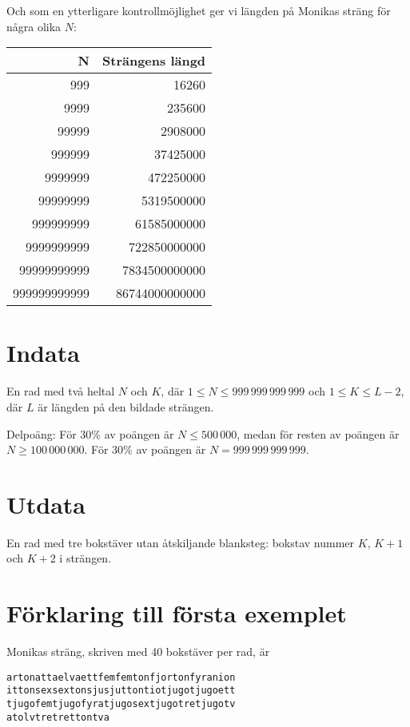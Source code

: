 Och som en ytterligare kontrollmöjlighet ger vi längden på Monikas sträng för några olika $N$:

\begin{tabular}{|r|r|}\hline
{\bf N} & {\bf Strängens längd} \\ \hline
999 & 16260 \\
9999 & 235600 \\
99999 & 2908000 \\
999999 & 37425000 \\
9999999   & 472250000 \\
99999999 & 5319500000\\
999999999 & 61585000000\\
9999999999 & 722850000000 \\
99999999999 &	7834500000000 \\
999999999999 &86744000000000 \\ \hline
\end{tabular}


\section*{Indata}
En rad med två heltal $N$ och $K$, där $1\leq N\leq 999\,999\,999\,999$ och $1\leq K \leq L-2$, där $L$ är längden på den bildade strängen.

Delpoäng: För 30\% av poängen är $ N\leq 500\,000$, medan för resten av poängen är $ N\geq 100\,000\,000$. För 30\% av poängen är $ N=999\,999\,999\,999$.

\section*{Utdata}
En rad med tre bokstäver utan åtskiljande blanksteg: bokstav nummer $K$, $K+1$ och $K+2$ i strängen. 

\section*{Förklaring till första exemplet}

Monikas sträng, skriven med 40 bokstäver per rad, är

\begin{verbatim}
artonattaelvaettfemfemtonfjortonfyranion
ittonsexsextonsjusjuttontiotjugotjugoett
tjugofemtjugofyratjugosextjugotretjugotv
atolvtretrettontva
\end{verbatim}
